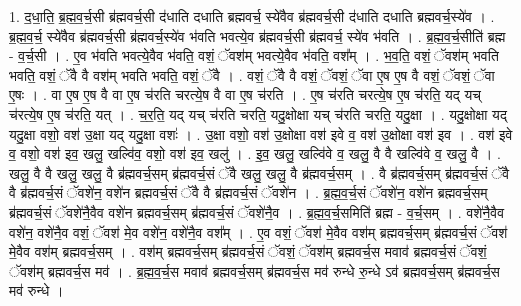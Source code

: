\documentclass[17pt]{extarticle}
\begin{document}
1. द॒धा॒ति॒ ब्र॒ह्म॒व॒र्च॒सी ब्र॑ह्मवर्च॒सी द॑धाति दधाति ब्रह्मवर्च॒ स्ये॑वैव ब्र॑ह्मवर्च॒सी द॑धाति दधाति ब्रह्मवर्च॒स्ये॑व । . ब्र॒ह्म॒व॒र्च॒ स्ये॑वैव ब्र॑ह्मवर्च॒सी ब्र॑ह्मवर्च॒स्ये॑व भ॑वति भवत्ये॒व ब्र॑ह्मवर्च॒सी ब्र॑ह्मवर्च॒ स्ये॑व भ॑वति । . ब्र॒ह्म॒व॒र्च॒सीति॑ ब्रह्म - व॒र्च॒सी । . ए॒व भ॑वति भवत्ये॒वैव भ॑वति॒ वशं॒ ॅवश॑म् भवत्ये॒वैव भ॑वति॒ वश᳚म् । . भ॒व॒ति॒ वशं॒ ॅवश॑म् भवति भवति॒ वशं॒ ॅवै वै वश॑म् भवति भवति॒ वशं॒ ॅवै । . वशं॒ ॅवै वै वशं॒ ॅवशं॒ ॅवा ए॒ष ए॒ष वै वशं॒ ॅवशं॒ ॅवा ए॒षः । . वा ए॒ष ए॒ष वै वा ए॒ष च॑रति चरत्ये॒ष वै वा ए॒ष च॑रति । . ए॒ष च॑रति चरत्ये॒ष ए॒ष च॑रति॒ यद् यच् च॑रत्ये॒ष ए॒ष च॑रति॒ यत् । . च॒र॒ति॒ यद् यच् च॑रति चरति॒ यदु॒क्षोक्षा यच् च॑रति चरति॒ यदु॒क्षा । . यदु॒क्षोक्षा यद् यदु॒क्षा वशो॒ वश॑ उ॒क्षा यद् यदु॒क्षा वशः॑ । . उ॒क्षा वशो॒ वश॑ उ॒क्षोक्षा वश॑ इवे व॒ वश॑ उ॒क्षोक्षा वश॑ इव । . वश॑ इवे व॒ वशो॒ वश॑ इव॒ खलु॒ खल्वि॑व॒ वशो॒ वश॑ इव॒ खलु॑ । . इ॒व॒ खलु॒ खल्वि॑वे व॒ खलु॒ वै वै खल्वि॑वे व॒ खलु॒ वै । . खलु॒ वै वै खलु॒ खलु॒ वै ब्र॑ह्मवर्च॒सम् ब्र॑ह्मवर्च॒सं ॅवै खलु॒ खलु॒ वै ब्र॑ह्मवर्च॒सम् । . वै ब्र॑ह्मवर्च॒सम् ब्र॑ह्मवर्च॒सं ॅवै वै ब्र॑ह्मवर्च॒सं ॅवशे॑न॒ वशे॑न ब्रह्मवर्च॒सं ॅवै वै ब्र॑ह्मवर्च॒सं ॅवशे॑न । . ब्र॒ह्म॒व॒र्च॒सं ॅवशे॑न॒ वशे॑न ब्रह्मवर्च॒सम् ब्र॑ह्मवर्च॒सं ॅवशे॑नै॒वैव वशे॑न ब्रह्मवर्च॒सम् ब्र॑ह्मवर्च॒सं ॅवशे॑नै॒व । . ब्र॒ह्म॒व॒र्च॒समिति॑ ब्रह्म - व॒र्च॒सम् । . वशे॑नै॒वैव वशे॑न॒ वशे॑नै॒व वशं॒ ॅवश॑ मे॒व वशे॑न॒ वशे॑नै॒व वश᳚म् । . ए॒व वशं॒ ॅवश॑ मे॒वैव वश॑म् ब्रह्मवर्च॒सम् ब्र॑ह्मवर्च॒सं ॅवश॑ मे॒वैव वश॑म् ब्रह्मवर्च॒सम् । . वश॑म् ब्रह्मवर्च॒सम् ब्र॑ह्मवर्च॒सं ॅवशं॒ ॅवश॑म् ब्रह्मवर्च॒स मवाव॑ ब्रह्मवर्च॒सं ॅवशं॒ ॅवश॑म् ब्रह्मवर्च॒स मव॑ । . ब्र॒ह्म॒व॒र्च॒स मवाव॑ ब्रह्मवर्च॒सम् ब्र॑ह्मवर्च॒स मव॑ रुन्धे रु॒न्धे ऽव॑ ब्रह्मवर्च॒सम् ब्र॑ह्मवर्च॒स मव॑ रुन्धे । \newline
\end{document}
